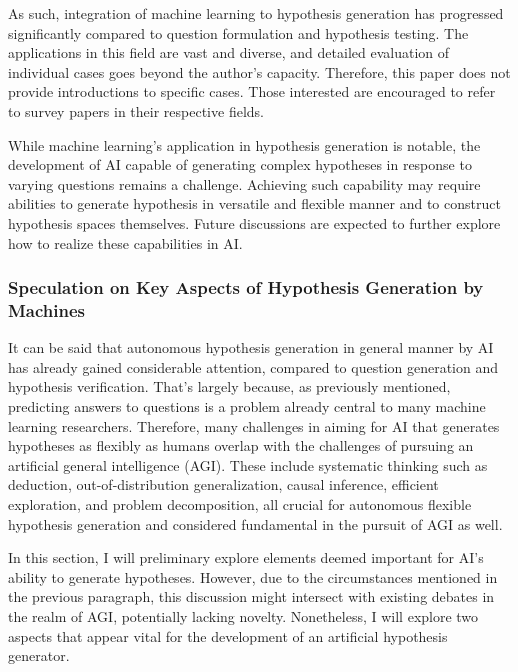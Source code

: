 \documentclass{article}
\begin{document}
As such, integration of machine learning to hypothesis generation has progressed significantly compared to question formulation and hypothesis testing. The applications in this field are vast and diverse, and detailed evaluation of individual cases goes beyond the author's capacity. Therefore, this paper does not provide introductions to specific cases. Those interested are encouraged to refer to survey papers in their respective fields.

While machine learning's application in hypothesis generation is notable, the development of AI capable of generating complex hypotheses in response to varying questions remains a challenge. Achieving such capability may require abilities to generate hypothesis in versatile and flexible manner and to construct hypothesis spaces themselves. Future discussions are expected to further explore how to realize these capabilities in AI.

\subsubsection{Speculation on Key Aspects of Hypothesis Generation by Machines}
It can be said that autonomous hypothesis generation in general manner by AI has already gained considerable attention, compared to question generation and hypothesis verification. That's largely because, as previously mentioned, predicting answers to questions is a problem already central to many machine learning researchers. Therefore, many challenges in aiming for AI that generates hypotheses as flexibly as humans overlap with the challenges of pursuing an artificial general intelligence (AGI). These include systematic thinking such as deduction, out-of-distribution generalization, causal inference, efficient exploration, and problem decomposition, all crucial for autonomous flexible hypothesis generation and considered fundamental in the pursuit of AGI as well.

In this section, I will preliminary explore elements deemed important for AI's ability to generate hypotheses. However, due to the circumstances mentioned in the previous paragraph, this discussion might intersect with existing debates in the realm of AGI, potentially lacking novelty. Nonetheless, I will explore two aspects that appear vital for the development of an artificial hypothesis generator.
\end{document}
